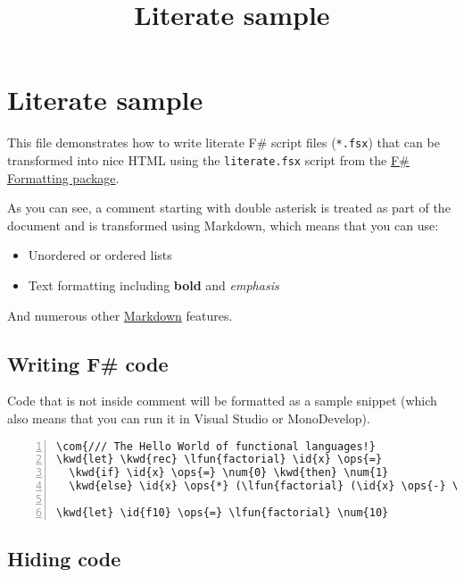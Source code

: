 \documentclass{article}
\title{Literate sample
}
\date{}
\newcommand{\id}[1]{\textcolor[HTML]{000000}{#1}}
\newcommand{\kwd}[1]{\textcolor[HTML]{0000FF}{#1}}
\newcommand{\com}[1]{\textcolor[HTML]{008000}{#1}}
\newcommand{\ops}[1]{\textcolor[HTML]{000000}{#1}}
\newcommand{\num}[1]{\textcolor[HTML]{000000}{#1}}
\newcommand{\lfun}[1]{\textcolor[HTML]{0000A0}{#1}}
\begin{document}
\maketitle

\section*{Literate sample}



This file demonstrates how to write literate F\# script
files (\texttt{*.fsx}) that can be transformed into nice HTML
using the \texttt{literate.fsx} script from the \href{http://tpetricek.github.com/FSharp.Formatting}{F\# Formatting
package}.


As you can see, a comment starting with double asterisk
is treated as part of the document and is transformed 
using Markdown, which means that you can use:
\begin{itemize}
\item Unordered or ordered lists

\item Text formatting including \textbf{bold} and \emph{emphasis}

\end{itemize}



And numerous other \href{http://daringfireball.net/projects/markdown}{Markdown} features.
\subsection*{Writing F\# code}



Code that is not inside comment will be formatted as
a sample snippet (which also means that you can 
run it in Visual Studio or MonoDevelop).
\begin{Verbatim}[commandchars=\\\{\}, numbers=left]
\com{/// The Hello World of functional languages!}
\kwd{let} \kwd{rec} \lfun{factorial} \id{x} \ops{=} 
  \kwd{if} \id{x} \ops{=} \num{0} \kwd{then} \num{1} 
  \kwd{else} \id{x} \ops{*} (\lfun{factorial} (\id{x} \ops{-} \num{1}))

\kwd{let} \id{f10} \ops{=} \lfun{factorial} \num{10}
\end{Verbatim}

\subsection*{Hiding code}
\end{document}
